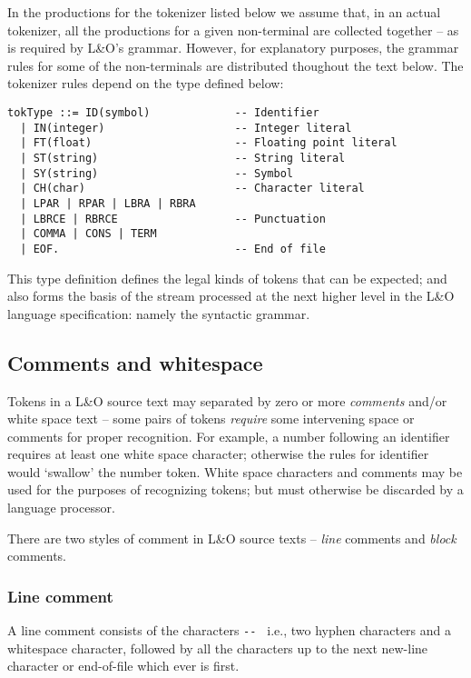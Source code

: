 In the productions for the tokenizer listed below we assume that, in an actual tokenizer, all the productions for a given non-terminal are collected together -- as is required by L&O's grammar. However, for explanatory purposes, the grammar rules for some of the non-terminals are distributed thoughout the text below.
\label{token:toktype}
The tokenizer rules depend on the  type defined below:
\begin{verbatim}
tokType ::= ID(symbol)             -- Identifier
  | IN(integer)                    -- Integer literal
  | FT(float)                      -- Floating point literal
  | ST(string)                     -- String literal
  | SY(string)                     -- Symbol
  | CH(char)                       -- Character literal
  | LPAR | RPAR | LBRA | RBRA
  | LBRCE | RBRCE                  -- Punctuation
  | COMMA | CONS | TERM
  | EOF.                           -- End of file
\end{verbatim}
This type definition defines the legal kinds of tokens that can be expected; and also forms the basis of the stream processed at the next higher level in the L&O language specification: namely the syntactic grammar.

\subsection{Comments and whitespace}
\label{token:comments}
Tokens in a L&O source text may separated by zero or more \emph{comments} and/or white space text -- some pairs of tokens \emph{require} some intervening space or comments for proper recognition. For example, a number following an identifier requires at least one white space character; otherwise the rules for identifier would `swallow' the number token.  White space characters and comments may be used for the purposes of recognizing tokens; but must otherwise be discarded by a language processor.

There are two styles of comment in L&O source texts -- \emph{line} comments and \emph{block} comments.

\subsubsection{Line comment}
\label{token:linecomment}
A line comment consists of the characters \verb+-- + i.e., two hyphen characters and a whitespace character, followed by all the characters up to the next new-line character or end-of-file which ever is first.

